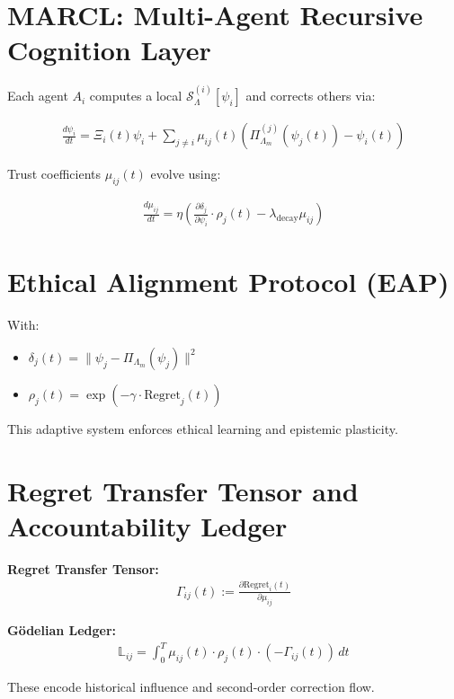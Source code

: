 \documentclass[12pt]{article}
\begin{document}
\section{MARCL: Multi-Agent Recursive Cognition Layer}

Each agent $A_i$ computes a local $\mathcal{S}_{\Lambda}^{(i)}[\psi_i]$ and corrects others via:

\begin{align}
\frac{d\psi_i}{dt} = \Xi_i(t)\psi_i + \sum_{j \neq i} \mu_{ij}(t) \left( \Pi_{\Lambda_m}^{(j)}(\psi_j(t)) - \psi_i(t) \right)
\end{align}

Trust coefficients $\mu_{ij}(t)$ evolve using:

\begin{align}
\frac{d\mu_{ij}}{dt} = \eta \left( \frac{\partial \delta_j}{\partial \psi_i} \cdot \rho_j(t) - \lambda_{\text{decay}} \mu_{ij} \right)
\end{align}

\section{Ethical Alignment Protocol (EAP)}

With:

\begin{itemize}
  \item $\delta_j(t) = \|\psi_j - \Pi_{\Lambda_m}(\psi_j)\|^2$
  \item $\rho_j(t) = \exp(-\gamma \cdot \text{Regret}_j(t))$
\end{itemize}

This adaptive system enforces ethical learning and epistemic plasticity.

\section{Regret Transfer Tensor and Accountability Ledger}

\textbf{Regret Transfer Tensor:}
\begin{align}
\Gamma_{ij}(t) := \frac{\partial \text{Regret}_i(t)}{\partial \mu_{ij}}
\end{align}

\textbf{Gödelian Ledger:}
\begin{align}
\mathbb{L}_{ij} = \int_0^T \mu_{ij}(t) \cdot \rho_j(t) \cdot (-\Gamma_{ij}(t)) \, dt
\end{align}

These encode historical influence and second-order correction flow.
\end{document}

